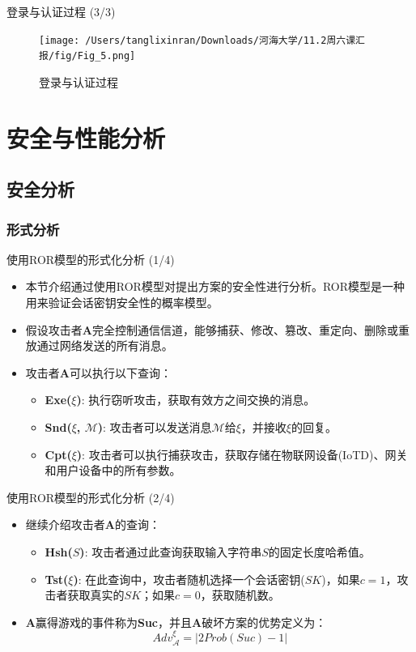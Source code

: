 \documentclass{beamer}
\begin{document}
\begin{frame}{登录与认证过程 (3/3)}
    \begin{figure}
        \centering
        \texttt{[image: /Users/tanglixinran/Downloads/河海大学/11.2周六课汇报/fig/Fig\_5.png]} %
        \caption{登录与认证过程}
    \end{figure}
\end{frame}

\section{安全与性能分析}
\subsection{安全分析}
\subsubsection{形式分析}
\begin{frame}{使用ROR模型的形式化分析 (1/4)}
    \begin{itemize}
        \item 本节介绍通过使用ROR模型对提出方案的安全性进行分析。ROR模型是一种用来验证会话密钥安全性的概率模型。
        \item 假设攻击者\textbf{A}完全控制通信信道，能够捕获、修改、篡改、重定向、删除或重放通过网络发送的所有消息。
        \item 攻击者\textbf{A}可以执行以下查询：
        \begin{itemize}
            \item \textbf{Exe($\xi$)}: 执行窃听攻击，获取有效方之间交换的消息。
            \item \textbf{Snd($\xi$, $\mathcal{M}$)}: 攻击者可以发送消息$\mathcal{M}$给$\xi$，并接收$\xi$的回复。
            \item \textbf{Cpt($\xi$)}: 攻击者可以执行捕获攻击，获取存储在物联网设备(IoTD)、网关和用户设备中的所有参数。
        \end{itemize}
    \end{itemize}
\end{frame}

\begin{frame}{使用ROR模型的形式化分析 (2/4)}
    \begin{itemize}
        \item 继续介绍攻击者\textbf{A}的查询：
        \begin{itemize}
            \item \textbf{Hsh($S$)}: 攻击者通过此查询获取输入字符串$S$的固定长度哈希值。
            \item \textbf{Tst($\xi$)}: 在此查询中，攻击者随机选择一个会话密钥($SK$)，如果$c=1$，攻击者获取真实的$SK$；如果$c=0$，获取随机数。
        \end{itemize}
        \item \textbf{A}赢得游戏的事件称为\textbf{Suc}，并且\textbf{A}破坏方案的优势定义为：
        \[
        Adv^\xi_{\mathcal{A}} = |2Prob(Suc) - 1|
        \]
    \end{itemize}
\end{frame}
\end{document}
